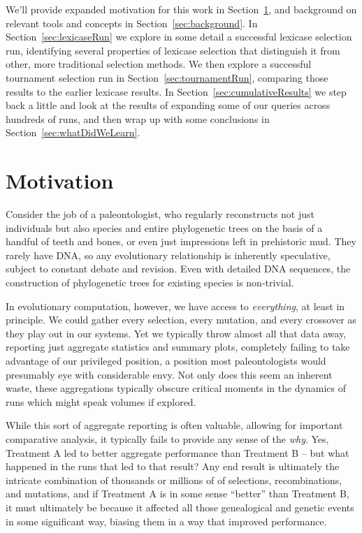 We'll provide expanded motivation for this work in Section~\ref{sec:motivation}, and background on relevant tools
and concepts in Section~\ref{sec:background}. In Section~\ref{sec:lexicaseRun} we explore in some detail a successful
lexicase selection run, identifying several properties of lexicase selection that distinguish it from
other, more traditional selection methods. We then explore a successful tournament selection run in
Section~\ref{sec:tournamentRun}, comparing those results to the earlier lexicase results. 
In Section~\ref{sec:cumulativeResults} we step back a little and look at the results of expanding some of our queries
across hundreds of runs, and then wrap up with some conclusions in Section~\ref{sec:whatDidWeLearn}.

\section{Motivation}
\label{sec:motivation}


Consider the job of a paleontologist, who regularly reconstructs not just individuals but also
species and entire phylogenetic trees on the basis of a handful of teeth and bones, or even just
impressions left in prehistoric mud. They rarely have DNA, so any evolutionary relationship is
inherently speculative, subject to constant debate and revision. Even with detailed DNA sequences,
the construction of phylogenetic trees for existing species is non-trivial.

In evolutionary computation, however, we have access to \emph{everything}, at least in principle. 
We could gather every
selection, every mutation, and every crossover as they play out in our systems.
Yet we typically throw almost all that data away, reporting just aggregate statistics and summary
plots, completely failing to take advantage of our privileged position, a position most 
paleontologists would presumably eye with considerable envy. Not only does this seem an inherent
waste, these aggregations typically obscure critical moments in the dynamics of runs which might
speak volumes if explored.

While this sort of aggregate reporting is often valuable, allowing for important comparative
analysis, it typically fails to provide
any sense of the \emph{why}. Yes, Treatment A led to better aggregate performance than 
Treatment B -- but what happened in the runs that led to that result? Any end result
is ultimately the intricate combination of thousands or millions of of selections, recombinations,
and mutations, and if Treatment A is in some sense ``better'' than Treatment B, it must ultimately
be because it affected all those genealogical and genetic events in some significant way, biasing them
in a way that improved performance.

